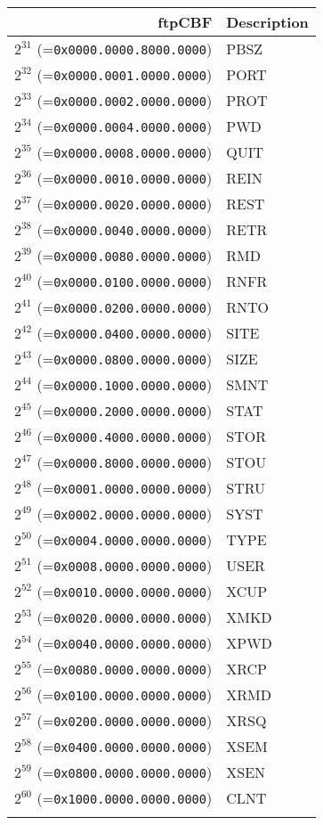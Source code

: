 \documentclass[documentation]{subfiles}
\begin{document}
\begin{minipage}{0.49\textwidth}
    \begin{longtable}{rl}
        \toprule
        {\bf ftpCBF} & {\bf Description} \\
        \midrule\endhead%
        $2^{31}$ (={\tt 0x0000.0000.8000.0000}) & PBSZ\\
        $2^{32}$ (={\tt 0x0000.0001.0000.0000}) & PORT\\
        $2^{33}$ (={\tt 0x0000.0002.0000.0000}) & PROT\\
        $2^{34}$ (={\tt 0x0000.0004.0000.0000}) & PWD\\
        $2^{35}$ (={\tt 0x0000.0008.0000.0000}) & QUIT\\
        $2^{36}$ (={\tt 0x0000.0010.0000.0000}) & REIN\\
        $2^{37}$ (={\tt 0x0000.0020.0000.0000}) & REST\\
        $2^{38}$ (={\tt 0x0000.0040.0000.0000}) & RETR\\
        $2^{39}$ (={\tt 0x0000.0080.0000.0000}) & RMD\\
        $2^{40}$ (={\tt 0x0000.0100.0000.0000}) & RNFR\\
        $2^{41}$ (={\tt 0x0000.0200.0000.0000}) & RNTO\\
        $2^{42}$ (={\tt 0x0000.0400.0000.0000}) & SITE\\
        $2^{43}$ (={\tt 0x0000.0800.0000.0000}) & SIZE\\
        $2^{44}$ (={\tt 0x0000.1000.0000.0000}) & SMNT\\
        $2^{45}$ (={\tt 0x0000.2000.0000.0000}) & STAT\\
        $2^{46}$ (={\tt 0x0000.4000.0000.0000}) & STOR\\
        $2^{47}$ (={\tt 0x0000.8000.0000.0000}) & STOU\\
        $2^{48}$ (={\tt 0x0001.0000.0000.0000}) & STRU\\
        $2^{49}$ (={\tt 0x0002.0000.0000.0000}) & SYST\\
        $2^{50}$ (={\tt 0x0004.0000.0000.0000}) & TYPE\\
        $2^{51}$ (={\tt 0x0008.0000.0000.0000}) & USER\\
        $2^{52}$ (={\tt 0x0010.0000.0000.0000}) & XCUP\\
        $2^{53}$ (={\tt 0x0020.0000.0000.0000}) & XMKD\\
        $2^{54}$ (={\tt 0x0040.0000.0000.0000}) & XPWD\\
        $2^{55}$ (={\tt 0x0080.0000.0000.0000}) & XRCP\\
        $2^{56}$ (={\tt 0x0100.0000.0000.0000}) & XRMD\\
        $2^{57}$ (={\tt 0x0200.0000.0000.0000}) & XRSQ\\
        $2^{58}$ (={\tt 0x0400.0000.0000.0000}) & XSEM\\
        $2^{59}$ (={\tt 0x0800.0000.0000.0000}) & XSEN\\
        $2^{60}$ (={\tt 0x1000.0000.0000.0000}) & CLNT\\\\
        \bottomrule
    \end{longtable}
\end{minipage}
\end{document}
